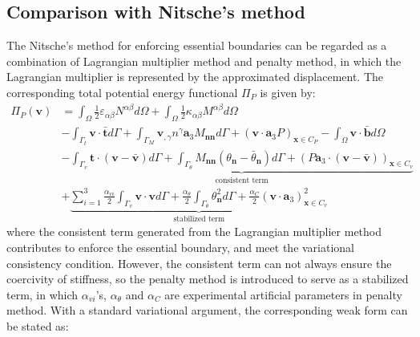 \subsection{Comparison with Nitsche's method}
The Nitsche's method for enforcing essential boundaries can be regarded as a combination of Lagrangian multiplier method and penalty method, in which the Lagrangian multiplier is represented by the approximated displacement. The corresponding total potential energy functional $\Pi_P$ is given by:
\begin{equation}
\begin{split}
\Pi_P(\boldsymbol v) &= \int_\Omega \frac{1}{2}\varepsilon_{\alpha\beta} N^{\alpha\beta} d\Omega +
\int_\Omega \frac{1}{2} \kappa_{\alpha\beta}M^{\alpha\beta} d\Omega \\
                     &- \int_{\Gamma_t} \boldsymbol v \cdot \bar{\boldsymbol t} d\Gamma 
                     + \int_{\Gamma_M} \boldsymbol v_{,\gamma} n^\gamma \boldsymbol a_3 M_{\boldsymbol{nn}} d\Gamma
                     + (\boldsymbol v \cdot \boldsymbol a_3 P)_{\boldsymbol x \in C_P}
                     - \int_\Omega \boldsymbol v \cdot \bar{\boldsymbol b} d\Omega \\
                     &- \underbrace{\int_{\Gamma_v} \boldsymbol t \cdot (\boldsymbol v - \bar{\boldsymbol v}) d\Gamma
                     + \int_{\Gamma_\theta} M_{\boldsymbol{nn}}(\theta_{\boldsymbol n} - \bar \theta_{\boldsymbol n})d\Gamma
                     + (P\boldsymbol a_3 \cdot (\boldsymbol v - \bar{\boldsymbol v}))_{\boldsymbol x \in C_v}}_{\text{consistent term}} \\
                     &+ \underbrace{\sum_{i=1}^3\frac{\alpha_{vi}}{2} \int_{\Gamma_v} \boldsymbol v \cdot \boldsymbol v d\Gamma 
                     + \frac{\alpha_\theta}{2} \int_{\Gamma_\theta} \theta_{\boldsymbol n}^2 d\Gamma
             + \frac{\alpha_C}{2}(\boldsymbol v \cdot \boldsymbol a_3)^2_{\boldsymbol x\in C_v}}_{\text{stabilized term}}
\end{split}
\end{equation}
where the consistent term generated from the Lagrangian multiplier method contributes to enforce the essential boundary, and meet the variational consistency condition. However, the consistent term can not always ensure the coercivity of stiffness, so the penalty method is introduced to serve as a stabilized term, in which $\alpha_{vi}$'s, $\alpha_\theta$ and $\alpha_C$ are experimental artificial parameters in penalty method. With a standard variational argument, the corresponding weak form can be stated as:
